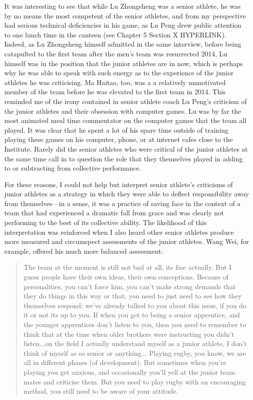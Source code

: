 \begin{CJK}{UTF8}{gbsn}
It was interesting to see that while Lu Zhongsheng was a senior athlete, he was by no means the most competent of the senior athletes, and from my perspective had serious technical deficiencies in his game, as Lu Peng drew public attention to one lunch time in the canteen (see Chapter 5 Section X HYPERLINK).  Indeed, as Lu Zhongsheng himself admitted in the same interview, before being catapulted to the first team after the men's team was resurrected 2014, Lu himself was in the position that the junior athletes are in now, which is perhaps why he was able to speak with such energy as to the experience of the junior athletes he was criticising. Ma Haitao, too, was a a relatively unmotivated member of the team before he was elevated to the first team in 2014.  This reminded me of the irony contained in senior athlete coach Lu Peng's criticism of the junior athletes and their obsession with computer games.  Lu was by far the most animated meal time commentator on the computer games that the team all played. It was clear that he spent a lot of his spare time outside of training playing these games on his computer, phone, or at internet cafes close to the Institute.  Rarely did the senior athletes who were critical of the junior athletes at the same time call in to question the role that they themselves played in adding to or subtracting from collective performance.

For these reasons, I could not help but interpret senior athlete's criticisms of junior athletes as a strategy in which they were able to deflect responsibility away from themselves---in a sense, it was a practice of saving face in the context of a team that had experienced a dramatic fall from grace and was clearly not performing to the best of its collective ability.  The likelihood of this interpretation was reinforced when I also heard other senior athletes produce more measured and circumspect assessments of the junior athletes.  Wang Wei, for example, offered his much more balanced assessment:

\begin{quotation}
   The team at the moment is still not bad at all, its fine actually.  But I guess people have their own ideas, their own conceptions.  Because of personalities, you can't force him, you can't make strong demands that they do things in this way or that, you need to just need to see how they themselves respond: we've already talked to you about this issue, if you do it or not its up to you.  If when you get to being a senior apprentice, and the younger apprentices don't listen to you, then you need to remember to think that at the time when older brothers were instructing you didn't listen...on the field I actually understand myself as a junior athlete,  I don't think of myself as so senior or anything... Playing rugby, you know,  we are all in different phases (of development).  But sometimes when you're playing you get anxious, and occasionally you'll yell at the junior team mates and criticise them.  But you need to play rugby with an encouraging method, you still need to be aware of your attitude.
\end{quotation}


\end{CJK}
